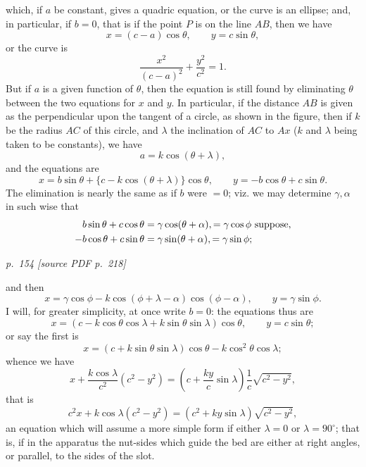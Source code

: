 \documentclass[11pt,a4paper]{article}
\newcommand{\sourcepage}[2]{%
  \bigskip
  \noindent\textit{p.~#1 [source PDF p.~#2]}%
  \par\smallskip
}
\begin{document}
which, if \(a\) be constant, gives a quadric equation, or the curve is an ellipse; and,
in particular, if \(b=0\), that is if the point \(P\) is on the line \(AB\), then we have
\[
x=(c-a)\cos\theta,\qquad y=c\sin\theta,
\]
or the curve is
\[
\frac{x^2}{(c-a)^2}+\frac{y^2}{c^2}=1.
\]
But if \(a\) is a given function of \(\theta\), then the equation is still found by
eliminating \(\theta\) between the two equations for \(x\) and \(y\). In particular,
if the distance \(AB\) is given as the perpendicular upon the tangent of a circle, as
shown in the figure, then if \(k\) be the radius \(AC\) of this circle, and \(\lambda\)
the inclination of \(AC\) to \(Ax\) (\(k\) and \(\lambda\) being taken to be constants),
we have
\[
a=k\cos(\theta+\lambda),
\]
and the equations are
\[
x=b\sin\theta+\{c-k\cos(\theta+\lambda)\}\cos\theta,\qquad
y=-b\cos\theta+c\sin\theta.
\]
The elimination is nearly the same as if \(b\) were \(=0\); viz. we may determine
\(\gamma,\alpha\) in such wise that
\[
\begin{aligned}
b\sin\theta+c\cos\theta&=\gamma\cos(\theta+\alpha),=\gamma\cos\phi\ \hbox{suppose},\\
-b\cos\theta+c\sin\theta&=\gamma\sin(\theta+\alpha),=\gamma\sin\phi;
\end{aligned}
\]

\sourcepage{154}{218}

and then
\[
x=\gamma\cos\phi-k\cos(\phi+\lambda-\alpha)\cos(\phi-\alpha),\qquad
y=\gamma\sin\phi.
\]
I will, for greater simplicity, at once write \(b=0\): the equations thus are
\[
x=(c-k\cos\theta\cos\lambda+k\sin\theta\sin\lambda)\cos\theta,\qquad
y=c\sin\theta;
\]
or say the first is
\[
x=(c+k\sin\theta\sin\lambda)\cos\theta-k\cos^2\theta\cos\lambda;
\]
whence we have
\[
x+\frac{k\cos\lambda}{c^2}(c^2-y^2)
=\left(c+\frac{ky}{c}\sin\lambda\right)\frac1c\sqrt{c^2-y^2},
\]
that is
\[
c^2x+k\cos\lambda(c^2-y^2)=(c^2+ky\sin\lambda)\sqrt{c^2-y^2},
\]
an equation which will assume a more simple form if either \(\lambda=0\) or
\(\lambda=90^\circ\); that is, if in the apparatus the nut-sides which guide the bed
are either at right angles, or parallel, to the sides of the slot.
\end{document}
